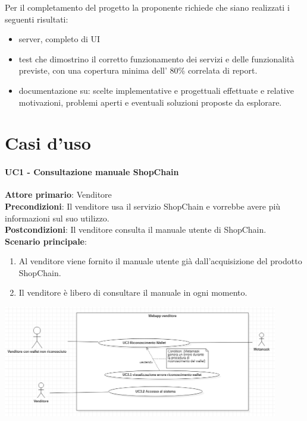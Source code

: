 \documentclass[a4paper, 12pt]{article}
\begin{document}
Per il completamento del progetto la proponente richiede che siano realizzati i seguenti risultati:
\begin{itemize}
\item server, completo di UI
\item test che dimostrino il corretto funzionamento dei servizi e delle funzionalità previste, con una copertura minima dell' 80\% correlata di report.
\item documentazione su: scelte implementative e progettuali effettuate e relative motivazioni, problemi aperti e eventuali soluzioni proposte da esplorare.
\end{itemize}

\section{Casi d'uso}

\paragraph{UC1 - Consultazione manuale ShopChain}
\textbf{Attore primario}: Venditore\\
\textbf{Precondizioni}: Il venditore usa il servizio ShopChain e vorrebbe avere più informazioni sul suo utilizzo.\\
\textbf{Postcondizioni}: Il venditore consulta il manuale utente di ShopChain.\\
\textbf{Scenario principale}:\\
\begin{enumerate}
\item Al venditore viene fornito il manuale utente già dall'acquisizione del prodotto ShopChain.
\item Il venditore è libero di consultare il manuale in ogni momento.
\end{enumerate}

\includegraphics[width=0.9\textwidth]{UseCase_venditore2.png}
\end{document}
